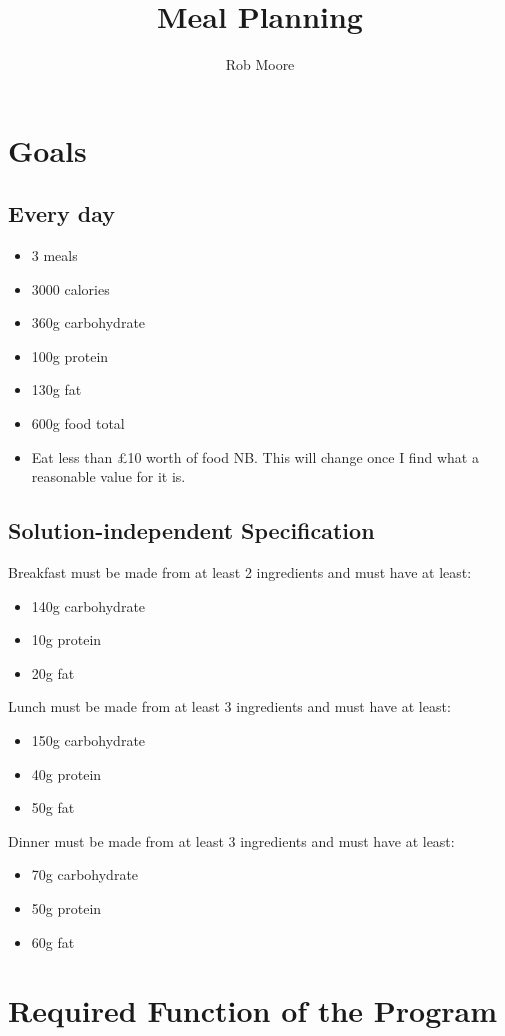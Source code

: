 \documentclass[a4paper]{article}
\title{Meal Planning}
\author{Rob Moore}
\begin{document}
\maketitle

\section{Goals}

\subsection{Every day}

\begin{itemize}
  \item 3 meals
  \item 3000 calories
  \item 360g carbohydrate
  \item 100g protein
  \item 130g fat
  \item 600g food total
  \item Eat less than £10 worth of food NB. This will change once I find what a reasonable value for it is.
\end{itemize}

\subsection{Solution-independent Specification}

Breakfast must be made from at least 2 ingredients and must have at least:
\begin{itemize}
  \item 140g carbohydrate
  \item 10g protein
  \item 20g fat
\end{itemize}

Lunch must be made from at least 3 ingredients and must have at least:
\begin{itemize}
  \item 150g carbohydrate
  \item 40g protein
  \item 50g fat
\end{itemize}

Dinner must be made from at least 3 ingredients and must have at least:
\begin{itemize}
  \item 70g carbohydrate
  \item 50g protein
  \item 60g fat
\end{itemize}

\section{Required Function of the Program}
\end{document}
